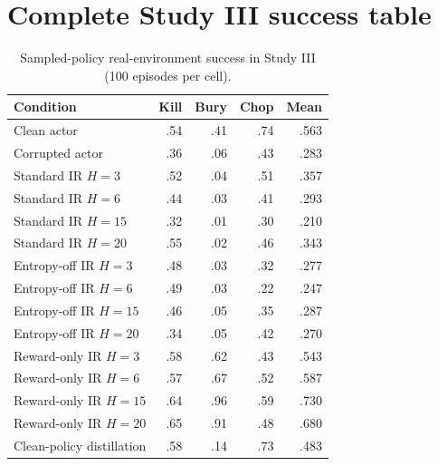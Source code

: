 \documentclass[10pt]{article}
\begin{document}
\section{Complete Study III success table}

\begin{table}[H]
\centering
\scriptsize
\caption{Sampled-policy real-environment success in Study III (100 episodes per cell).}
\begin{tabular}{lrrrr}
\toprule
Condition & Kill & Bury & Chop & Mean \\
\midrule
Clean actor & .54 & .41 & .74 & .563 \\
Corrupted actor & .36 & .06 & .43 & .283 \\
Standard IR $H=3$ & .52 & .04 & .51 & .357 \\
Standard IR $H=6$ & .44 & .03 & .41 & .293 \\
Standard IR $H=15$ & .32 & .01 & .30 & .210 \\
Standard IR $H=20$ & .55 & .02 & .46 & .343 \\
Entropy-off IR $H=3$ & .48 & .03 & .32 & .277 \\
Entropy-off IR $H=6$ & .49 & .03 & .22 & .247 \\
Entropy-off IR $H=15$ & .46 & .05 & .35 & .287 \\
Entropy-off IR $H=20$ & .34 & .05 & .42 & .270 \\
Reward-only IR $H=3$ & .58 & .62 & .43 & .543 \\
Reward-only IR $H=6$ & .57 & .67 & .52 & .587 \\
Reward-only IR $H=15$ & .64 & .96 & .59 & .730 \\
Reward-only IR $H=20$ & .65 & .91 & .48 & .680 \\
Clean-policy distillation & .58 & .14 & .73 & .483 \\
\bottomrule
\end{tabular}
\end{table}
\end{document}
